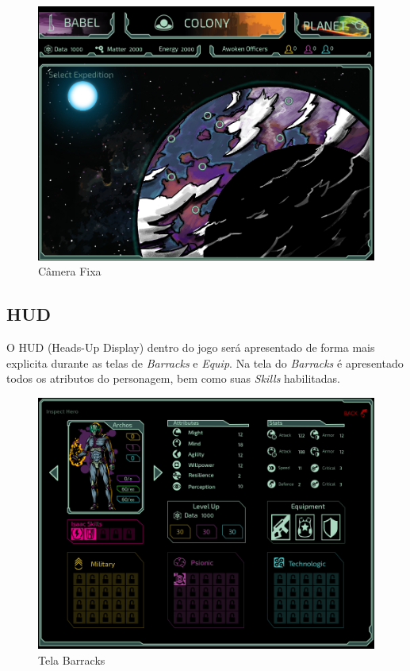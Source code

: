 \documentclass[11pt]{article} %
\begin{document}
\begin{figure}[!htp]
\centering
\includegraphics[scale=0.25]{res/planet.png}
\caption{Câmera Fixa}
\label{Câmera Fixa}
\end{figure}

\subsection{HUD}

O HUD (Heads-Up Display) dentro do jogo será apresentado de forma mais explicita durante as telas de \textit{Barracks} e \textit{Equip}. Na tela do \textit{Barracks} é apresentado todos os atributos do personagem, bem como suas \textit{Skills} habilitadas.

\begin{figure}[!htp]
\centering
\includegraphics[scale=0.25]{res/barracks.png}
\caption{Tela Barracks}
\label{Tela Barracks}
\end{figure}
\end{document}
